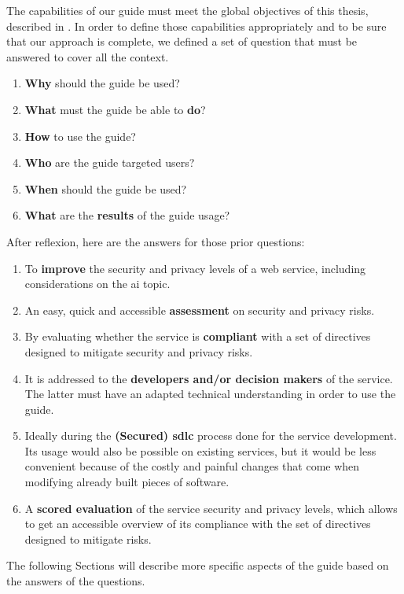 The capabilities of our guide must meet the global objectives of this thesis, described in . In order to define those capabilities appropriately and to be sure that our approach is complete, we defined a set of question that must be answered to cover all the context. 
\begin{enumerate}
    \item \textbf{Why} should the guide be used?
    \item \textbf{What} must the guide be able to \textbf{do}?
    \item \textbf{How} to use the guide?
    \item \textbf{Who} are the guide targeted users?
    \item \textbf{When} should the guide be used?
    \item \textbf{What} are the \textbf{results} of the guide usage?
\end{enumerate}

After reflexion, here are the answers for those prior questions:
\begin{enumerate}
    \item To \textbf{improve} the security and privacy levels of a web service, including considerations on the \gls{ai} topic.
    \item An easy, quick and accessible \textbf{assessment} on security and privacy risks.
    \item By evaluating whether the service is \textbf{compliant} with a set of directives designed to mitigate security and privacy risks.
    \item It is addressed to the \textbf{developers and/or decision makers} of the service. The latter must have an adapted technical understanding in order to use the guide.
    \item Ideally during the \textbf{(Secured) \gls{sdlc}} process done for the service development. Its usage would also be possible on existing services, but it would be less convenient because of the costly and painful changes that come when modifying already built pieces of software.
    \item A \textbf{scored evaluation} of the service security and privacy levels, which allows to get an accessible overview of its compliance with the set of directives designed to mitigate risks.
\end{enumerate}

The following Sections will describe more specific aspects of the guide based on the answers of the questions.

